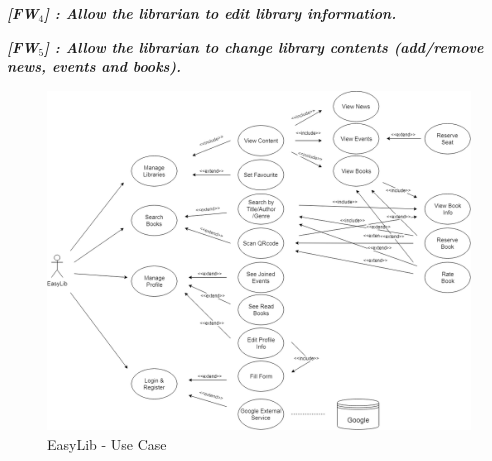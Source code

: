 \vspace{0.5cm}
\noindent
\emph{\textbf{[FW$_{4}$] : Allow the librarian to edit library information.}}

\vspace{0.5cm}
\noindent
\emph{\textbf{[FW$_{5}$] : Allow the librarian to change library contents (add/remove news, events and books).}}

\vspace{0.5cm}
\vspace{0.5cm}
\vspace*{0cm}
\begin{figure}[H]
	\centering
	\includegraphics[scale=0.4]{Images/UseCases/EasyLib_use_case}
	\caption{EasyLib - Use Case}
\end{figure}
